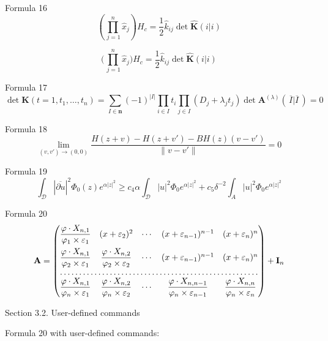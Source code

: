 \documentclass{article}
\begin{document}
Formula 16
\[
   \left( \prod^n_{\, j = 1} \hat x_{j} \right) H_{c} =
    \frac{1}{2} \hat k_{ij} \det \hat{ \mathbf{K} }(i|i)
\]

\[
   \biggl( \prod^n_{\, j = 1} \hat x_{j} \biggr) H_{c} =
    \frac{1}{2} \hat{k}_{ij} \det \widehat{ \mathbf{K} }(i|i)
\]

Formula 17
\[
   \det \mathbf{K} (t = 1, t_{1}, \ldots, t_{n}) =
    \sum_{I \in \mathbf{n} }(-1)^{|I|}
    \prod_{i \in I} t_{i}
    \prod_{j \in I} (D_{j} + \lambda_{j} t_{j})
    \det \mathbf{A}^{(\lambda)} (\,\overline{I} | \overline{I}\,) = 0
\]

Formula 18
\[
   \lim_{(v, v') \to (0, 0)}
    \frac{H(z + v) - H(z + v') - BH(z)(v - v')}
         {\| v - v' \|} = 0
\]

Formula 19
\[
   \int_{\mathcal{D}} | \overline{\partial u} |^{2}
    \Phi_{0}(z) e^{\alpha |z|^2} \geq
    c_{4} \alpha \int_{\mathcal{D}} |u|^{2} \Phi_{0}
    e^{\alpha |z|^{2}} + c_{5} \delta^{-2} \int_{A}
    |u|^{2} \Phi_{0} e^{\alpha |z|^{2}}
\]

Formula 20
\[
   \mathbf{A} =
   \begin{pmatrix}
      \dfrac{\varphi \cdot X_{n, 1}}
            {\varphi_{1} \times \varepsilon_{1}}
      & (x + \varepsilon_{2})^{2} & \cdots
      & (x + \varepsilon_{n - 1})^{n - 1}
      & (x + \varepsilon_{n})^{n}\\[10pt]
      \dfrac{\varphi \cdot X_{n, 1}}
            {\varphi_{2} \times \varepsilon_{1}}
      & \dfrac{\varphi \cdot X_{n, 2}}
              {\varphi_{2} \times \varepsilon_{2}}
      & \cdots & (x + \varepsilon_{n - 1})^{n - 1}
      & (x + \varepsilon_{n})^{n}\\
      \hdotsfor{5}\\
      \dfrac{\varphi \cdot X_{n, 1}}
            {\varphi_{n} \times \varepsilon_{1}}
      & \dfrac{\varphi \cdot X_{n, 2}}
              {\varphi_{n} \times \varepsilon_{2}}
      & \cdots & \dfrac{\varphi \cdot X_{n, n - 1}}
                       {\varphi_{n} \times \varepsilon_{n - 1}}
      & \dfrac{\varphi\cdot X_{n, n}}
              {\varphi_{n} \times \varepsilon_{n}}
   \end{pmatrix}
    + \mathbf{I}_{n}
\]


Section 3.2. User-defined commands

Formula 20 with user-defined commands:

\newcommand{\quot}[2]{%
\dfrac{\varphi \cdot X_{n, #1}}%
{\varphi_{#2} \times \varepsilon_{#1}}}
\newcommand{\exn}[1]{(x+\varepsilon_{#1})^{#1}}
\end{document}
